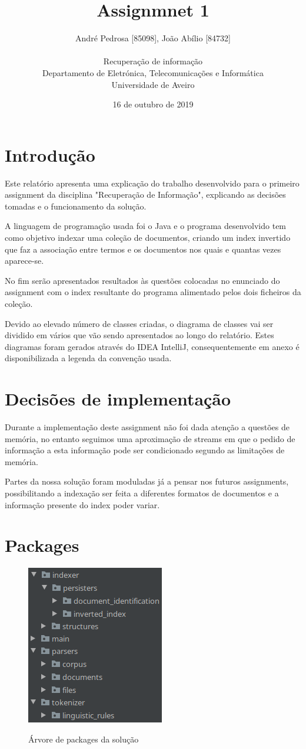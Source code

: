 \documentclass[12pt]{article}
\title{Assignmnet 1}
\author{
    André Pedrosa [85098], João Abílio [84732]\\
    \\
    Recuperação de informação\\
    \normalsize{Departamento de Eletrónica, Telecomunicações e Informática}\\
    \normalsize{Universidade de Aveiro}\\
}
\date{16 de outubro de 2019}
\begin{document}
\baselineskip18pt

\maketitle

\section{Introdução}
Este relatório apresenta uma explicação do trabalho desenvolvido
para o primeiro assignment da disciplina "Recuperação de Informação",
explicando as decisões tomadas e o funcionamento da solução.

A linguagem de programação usada foi o Java e o programa desenvolvido
tem como objetivo indexar uma coleção de documentos, criando um index
invertido que faz a associação entre termos e os documentos nos quais e
quantas vezes aparece-se.

No fim serão apresentados resultados às questões colocadas no enunciado
do assignment com o index resultante do programa alimentado pelos dois
ficheiros da coleção.

Devido ao elevado número de classes criadas, o diagrama de classes vai ser
dividido em vários que vão sendo apresentados ao longo do relatório. Estes
diagramas foram gerados através do IDEA IntelliJ, consequentemente em anexo
é disponibilizada a legenda da convenção usada.

\section{Decisões de implementação}
Durante a implementação deste assignment não foi dada atenção a questões de memória,
no entanto seguimos uma aproximação de streams em que o pedido de informação
a esta informação pode ser condicionado segundo as limitações de memória.

Partes da nossa solução foram moduladas já a pensar nos futuros assignments,
possibilitando a indexação ser feita a diferentes formatos de documentos e a informação
presente do index poder variar.

\section{Packages}

\begin{figure}[H]
  \center
  \includegraphics[width=6cm]{packages_all.png}
  \label{fig:packages_all}
  \caption{Árvore de packages da solução}
\end{figure}
\end{document}
